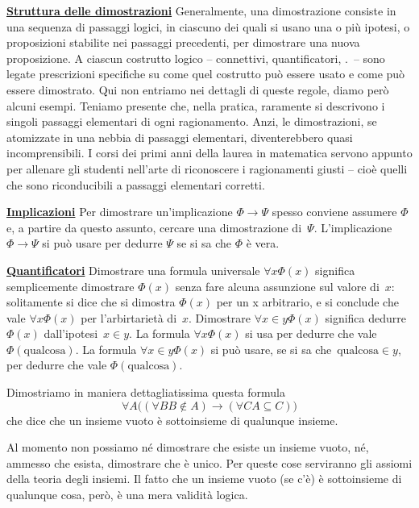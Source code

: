\textbf{\underline{Struttura delle dimostrazioni}} Generalmente, una
dimostrazione consiste in una sequenza di passaggi logici, in ciascuno dei
quali si {\drkblu usano} una o pi\`u ipotesi, o proposizioni stabilite nei
passaggi precedenti, per {\drkred dimostrare} una nuova proposizione. A
ciascun costrutto logico -- connettivi, quantificatori, \etc.\ -- sono
legate prescrizioni specifiche su come quel costrutto pu\`o essere
{\drkblu usato} e come pu\`o essere {\drkred dimostrato.} Qui non entriamo
nei dettagli di queste regole, diamo per\`o alcuni esempi. Teniamo
presente che, nella pratica, raramente si descrivono i singoli passaggi
elementari di ogni ragionamento. Anzi, le dimostrazioni, se atomizzate in
una nebbia di passaggi elementari, diventerebbero quasi incomprensibili.
I corsi dei primi anni della laurea in matematica servono appunto per
allenare gli studenti nell'arte di riconoscere i ragionamenti giusti --
cio\`e quelli che sono riconducibili a passaggi elementari corretti.

\textbf{\underline{Implicazioni}} Per {\drkred dimostrare} un'implicazione $\Phi
\rightarrow \Psi$ spesso conviene assumere $\Phi$ e, a partire da questo
assunto, cercare una dimostrazione di~$\Psi$. L'implicazione
$\Phi \rightarrow \Psi$ si pu\`o {\drkblu usare} per dedurre $\Psi$ se si sa che
$\Phi$ \`e vera.

\textbf{\underline{Quantificatori}} {\drkred Dimostrare} una formula universale
$\forall x \Phi(x)$ significa semplicemente dimostrare $\Phi(x)$ senza fare
alcuna assunzione sul valore di~$x$: solitamente si dice che si dimostra
$\Phi(x)$ per un x {\drkred arbitrario,} e si conclude che vale $\forall x
\Phi(x)$ per l'arbirtariet\`a di~$x$. {\drkred Dimostrare} $\forall {x\in
y}
\Phi(x)$ significa dedurre $\Phi(x)$ dall'ipotesi~$x\in y$.
La formula $\forall x \Phi(x)$
{\drkblu si usa} per dedurre che vale $\Phi(\text{qualcosa})$. La
formula $\forall {x\in y} \Phi(x)$ {\drkblu si pu\`o usare}, se si sa
che~$\text{qualcosa}\in y$, per dedurre che vale
$\Phi(\text{qualcosa})$.

\begin{example}
Dimostriamo in maniera dettagliatissima questa formula
\[ \forall A \bigl((\forall B B \not\in A) \rightarrow (\forall C A \subseteq
C)\bigr) \]
che dice che un insieme vuoto \`e sottoinsieme di qualunque insieme.
\end{example}

\begin{note}
Al momento non possiamo n\'e dimostrare che esiste un insieme vuoto, n\'e,
ammesso che esista, dimostrare che \`e unico. Per queste cose serviranno gli
assiomi della teoria degli insiemi. Il fatto che un insieme vuoto (se c'\`e)
\`e sottoinsieme di qualunque cosa, per\`o, \`e una mera validit\`a logica.
\end{note}

